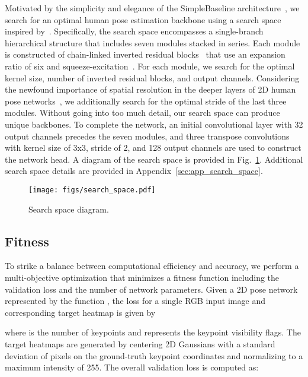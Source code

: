 \documentclass{ieeeaccess}
\newcommand\hl[1]{#1}
\begin{document}
Motivated by the simplicity and elegance of the SimpleBaseline architecture~\cite{xiao2018simple}, we search for an optimal human pose estimation backbone using a search space inspired by~\cite{tan2019mnasnet, tan2019efficientnet}. Specifically, the search space encompasses a single-branch hierarchical structure that includes seven modules stacked in series. Each module is constructed of chain-linked inverted residual blocks~\cite{sandler2018mobilenetv2} that use an expansion ratio of six and squeeze-excitation~\cite{hu2018squeeze}. For each module, we search for the optimal kernel size, number of inverted residual blocks, and output channels. Considering the newfound importance of spatial resolution in the deeper layers of 2D human pose networks~\cite{sun2019deep}, we additionally search for the optimal stride of the last three modules. Without going into too much detail, our search space can produce  unique backbones. To complete the network, an initial convolutional layer with 32 output channels precedes the seven modules, and three transpose convolutions with kernel size of 3x3, stride of 2, and 128 output channels are used to construct the network head. A diagram of the search space is provided in Fig.~\ref{fig:search_space}. Additional search space details are provided in Appendix~\ref{sec:app_search_space}.

\begin{figure}[h]
\centering
\texttt{[image: figs/search\_space.pdf]}
\caption{Search space diagram.}
\label{fig:search_space}
\end{figure}

\subsection{Fitness} 
To strike a balance between computational efficiency and accuracy, we perform a multi-objective optimization that minimizes a fitness function including the validation loss and the number of network parameters. Given a 2D pose network represented by the function , the loss \hl{} for a single RGB input image  and corresponding target heatmap  is given by

\newcommand{\norm}[1]{\left\lVert#1\right\rVert}

where  is the number of keypoints and  represents the keypoint visibility flags\footnotemark[1]. The target heatmaps  are generated by centering 2D Gaussians with a standard deviation of  pixels on the ground-truth keypoint coordinates \hl{and normalizing to a maximum intensity of 255. The overall validation loss is computed as:}
\end{document}
